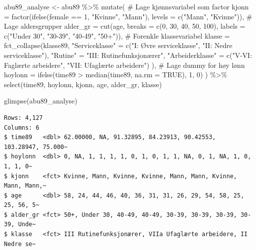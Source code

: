 \documentclass[
  norsk,
  letterpaper,
  DIV=11,
  numbers=noendperiod]{scrreprt}
\newenvironment{Shaded}{\begin{snugshade}}{\end{snugshade}}
\newcommand{\AttributeTok}[1]{\textcolor[rgb]{0.40,0.45,0.13}{#1}}
\newcommand{\CommentTok}[1]{\textcolor[rgb]{0.37,0.37,0.37}{#1}}
\newcommand{\ConstantTok}[1]{\textcolor[rgb]{0.56,0.35,0.01}{#1}}
\newcommand{\DecValTok}[1]{\textcolor[rgb]{0.68,0.00,0.00}{#1}}
\newcommand{\FunctionTok}[1]{\textcolor[rgb]{0.28,0.35,0.67}{#1}}
\newcommand{\NormalTok}[1]{\textcolor[rgb]{0.00,0.23,0.31}{#1}}
\newcommand{\OtherTok}[1]{\textcolor[rgb]{0.00,0.23,0.31}{#1}}
\newcommand{\SpecialCharTok}[1]{\textcolor[rgb]{0.37,0.37,0.37}{#1}}
\newcommand{\StringTok}[1]{\textcolor[rgb]{0.13,0.47,0.30}{#1}}
\theoremstyle{definition}
\theoremstyle{remark}
\begin{document}
\begin{Shaded}
\begin{Highlighting}[]
\NormalTok{abu89\_analyse }\OtherTok{\textless{}{-}}\NormalTok{ abu89 }\SpecialCharTok{\%\textgreater{}\%}
  \FunctionTok{mutate}\NormalTok{(}
    \CommentTok{\# Lage kjønnsvariabel som factor}
    \AttributeTok{kjonn =} \FunctionTok{factor}\NormalTok{(}\FunctionTok{ifelse}\NormalTok{(female }\SpecialCharTok{==} \DecValTok{1}\NormalTok{, }\StringTok{"Kvinne"}\NormalTok{, }\StringTok{"Mann"}\NormalTok{),}
                   \AttributeTok{levels =} \FunctionTok{c}\NormalTok{(}\StringTok{"Mann"}\NormalTok{, }\StringTok{"Kvinne"}\NormalTok{)),}
    \CommentTok{\# Lage aldersgrupper}
    \AttributeTok{alder\_gr =} \FunctionTok{cut}\NormalTok{(age, }\AttributeTok{breaks =} \FunctionTok{c}\NormalTok{(}\DecValTok{0}\NormalTok{, }\DecValTok{30}\NormalTok{, }\DecValTok{40}\NormalTok{, }\DecValTok{50}\NormalTok{, }\DecValTok{100}\NormalTok{),}
                   \AttributeTok{labels =} \FunctionTok{c}\NormalTok{(}\StringTok{"Under 30"}\NormalTok{, }\StringTok{"30{-}39"}\NormalTok{, }\StringTok{"40{-}49"}\NormalTok{, }\StringTok{"50+"}\NormalTok{)),}
    \CommentTok{\# Forenkle klassevariabel}
    \AttributeTok{klasse =} \FunctionTok{fct\_collapse}\NormalTok{(klasse89,}
      \StringTok{"Serviceklasse"} \OtherTok{=} \FunctionTok{c}\NormalTok{(}\StringTok{"I: Øvre serviceklasse"}\NormalTok{, }\StringTok{"II: Nedre serviceklasse"}\NormalTok{),}
      \StringTok{"Rutine"} \OtherTok{=} \StringTok{"III: Rutinefunksjonærer"}\NormalTok{,}
      \StringTok{"Arbeiderklasse"} \OtherTok{=} \FunctionTok{c}\NormalTok{(}\StringTok{"V{-}VI: Faglærte arbeidere"}\NormalTok{, }\StringTok{"VII: Ufaglærte arbeidere"}\NormalTok{)}
\NormalTok{    ),}
    \CommentTok{\# Lage dummy for høy lønn}
    \AttributeTok{hoylonn =} \FunctionTok{ifelse}\NormalTok{(time89 }\SpecialCharTok{\textgreater{}} \FunctionTok{median}\NormalTok{(time89, }\AttributeTok{na.rm =} \ConstantTok{TRUE}\NormalTok{), }\DecValTok{1}\NormalTok{, }\DecValTok{0}\NormalTok{)}
\NormalTok{  ) }\SpecialCharTok{\%\textgreater{}\%}
  \FunctionTok{select}\NormalTok{(time89, hoylonn, kjonn, age, alder\_gr, klasse)}

\FunctionTok{glimpse}\NormalTok{(abu89\_analyse)}
\end{Highlighting}
\end{Shaded}

\begin{verbatim}
Rows: 4,127
Columns: 6
$ time89   <dbl> 62.00000, NA, 91.32895, 84.23913, 90.42553, 103.28947, 75.000~
$ hoylonn  <dbl> 0, NA, 1, 1, 1, 1, 0, 1, 0, 1, 1, NA, 0, 1, NA, 1, 0, 1, 1, 0~
$ kjonn    <fct> Kvinne, Mann, Kvinne, Kvinne, Mann, Mann, Kvinne, Mann, Mann,~
$ age      <dbl> 58, 24, 44, 46, 40, 36, 31, 31, 26, 29, 54, 58, 25, 25, 56, 5~
$ alder_gr <fct> 50+, Under 30, 40-49, 40-49, 30-39, 30-39, 30-39, 30-39, Unde~
$ klasse   <fct> III Rutinefunksjonærer, VIIa Ufaglærte arbeidere, II Nedre se~
\end{verbatim}
\end{document}

